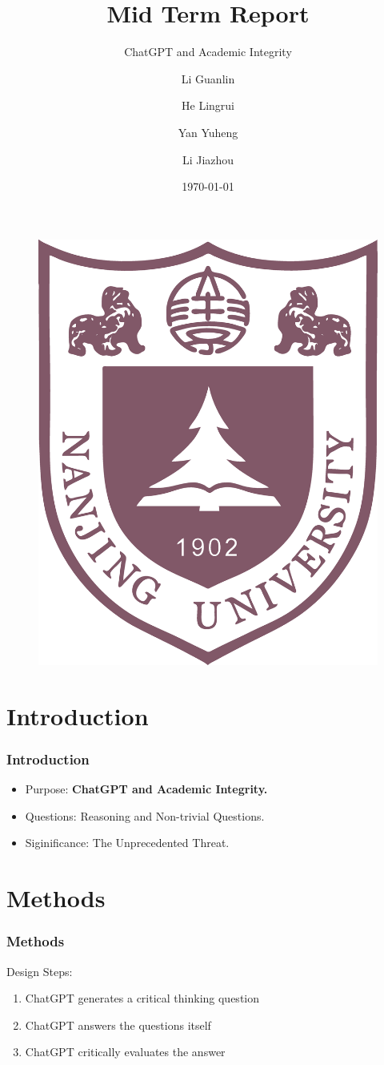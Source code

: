 \documentclass{beamer}
\title[Reflection on ChatGPT]
{Mid Term Report}
\subtitle{ChatGPT and Academic Integrity}
\author[Eric] %
{Li Guanlin\inst{1} \and He Lingrui\inst{1} \and Yan Yuheng \inst{1} \and Li Jiazhou \inst{1}}
\institute[NJU] %
{
\inst{1}%
Undergraduates in ICS\\
Nanjing University
\and
}
\date[NJU 2023] %
{\today}
\begin{document}
\begin{frame}
    \titlepage
    \begin{figure}[htpb]
        \begin{center}
            \includegraphics[width=0.14\linewidth]{pic/NJU_Logo.eps}
        \end{center}
    \end{figure}
\end{frame}

\begin{frame}
    \tableofcontents[sectionstyle=show,subsectionstyle=show/shaded/hide,subsubsectionstyle=show/shaded/hide]
\end{frame}

\section{Introduction}

\begin{frame}
    \frametitle{Introduction}
    \Large
    \begin{itemize}
        \item Purpose: \textbf{ChatGPT and Academic Integrity.}
        \item Questions: Reasoning and Non-trivial Questions.
        \item Siginificance: \alert{The Unprecedented Threat.}%
    \end{itemize}
\end{frame}

\section{Methods}

\begin{frame}
    \frametitle{Methods}
    \Large
    \begin{block}{Design}
        Steps:

        \begin{enumerate}
            \item<1-> ChatGPT generates a critical thinking question
            \item<2-> ChatGPT answers the questions itself
            \item<3-> ChatGPT critically evaluates the answer
        \end{enumerate}
    \end{block}
\end{frame}
\end{document}
